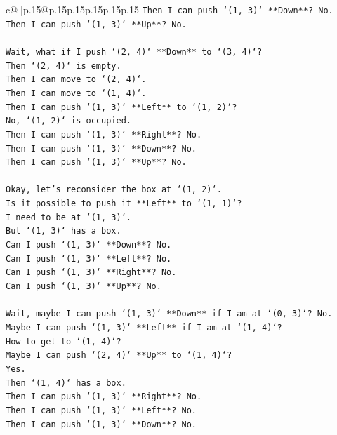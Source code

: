 \documentclass{article}
\begin{document}
{\begin{supertabular}{c@{$\;$}|p{.15\linewidth}@{}p{.15\linewidth}p{.15\linewidth}p{.15\linewidth}p{.15\linewidth}p{.15\linewidth}}
{{{\texttt{Then I can push `(1, 3)` **Down**? No.} \\
\texttt{Then I can push `(1, 3)` **Up**? No.} \\
\\ 
\texttt{Wait, what if I push `(2, 4)` **Down** to `(3, 4)`?} \\
\texttt{Then `(2, 4)` is empty.} \\
\texttt{Then I can move to `(2, 4)`.} \\
\texttt{Then I can move to `(1, 4)`.} \\
\texttt{Then I can push `(1, 3)` **Left** to `(1, 2)`?} \\
\texttt{No, `(1, 2)` is occupied.} \\
\texttt{Then I can push `(1, 3)` **Right**? No.} \\
\texttt{Then I can push `(1, 3)` **Down**? No.} \\
\texttt{Then I can push `(1, 3)` **Up**? No.} \\
\\ 
\texttt{Okay, let's reconsider the box at `(1, 2)`.} \\
\texttt{Is it possible to push it **Left** to `(1, 1)`?} \\
\texttt{I need to be at `(1, 3)`.} \\
\texttt{But `(1, 3)` has a box.} \\
\texttt{Can I push `(1, 3)` **Down**? No.} \\
\texttt{Can I push `(1, 3)` **Left**? No.} \\
\texttt{Can I push `(1, 3)` **Right**? No.} \\
\texttt{Can I push `(1, 3)` **Up**? No.} \\
\\ 
\texttt{Wait, maybe I can push `(1, 3)` **Down** if I am at `(0, 3)`? No.} \\
\texttt{Maybe I can push `(1, 3)` **Left** if I am at `(1, 4)`?} \\
\texttt{How to get to `(1, 4)`?} \\
\texttt{Maybe I can push `(2, 4)` **Up** to `(1, 4)`?} \\
\texttt{Yes.} \\
\texttt{Then `(1, 4)` has a box.} \\
\texttt{Then I can push `(1, 3)` **Right**? No.} \\
\texttt{Then I can push `(1, 3)` **Left**? No.} \\
\texttt{Then I can push `(1, 3)` **Down**? No.} \\
}}}
\end{supertabular}}
\end{document}

